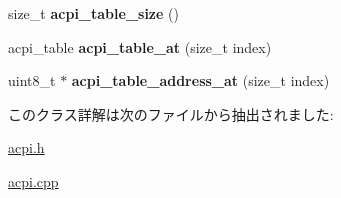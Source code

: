 \begin{DoxyCompactItemize}
\item 
\hypertarget{classacpi__xsdt_a783b4ff904191b61a9a3aa363d5056ef}{}size\+\_\+t {\bfseries acpi\+\_\+table\+\_\+size} ()\label{classacpi__xsdt_a783b4ff904191b61a9a3aa363d5056ef}

\item 
\hypertarget{classacpi__xsdt_a4d2326989b3fda0dbb32e480d2b92c97}{}acpi\+\_\+table {\bfseries acpi\+\_\+table\+\_\+at} (size\+\_\+t index)\label{classacpi__xsdt_a4d2326989b3fda0dbb32e480d2b92c97}

\item 
\hypertarget{classacpi__xsdt_a07d908cc4f42f15d3e4529b844763abc}{}uint8\+\_\+t $\ast$ {\bfseries acpi\+\_\+table\+\_\+address\+\_\+at} (size\+\_\+t index)\label{classacpi__xsdt_a07d908cc4f42f15d3e4529b844763abc}

\end{DoxyCompactItemize}


このクラス詳解は次のファイルから抽出されました\+:\begin{DoxyCompactItemize}
\item 
\hyperlink{acpi_8h}{acpi.\+h}\item 
\hyperlink{acpi_8cpp}{acpi.\+cpp}\end{DoxyCompactItemize}
